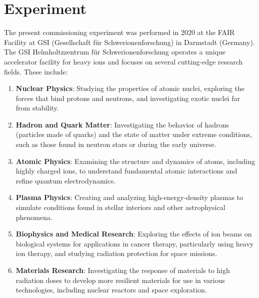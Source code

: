\section{Experiment}
The present commissioning experiment was performed in 2020 at the FAIR Facility at GSI (Gesellschaft f\"ur Schwerionenforschung) in Darmstadt (Germany). The GSI Helmholtzzentrum für Schwerionenforschung operates a unique accelerator facility for heavy ions and focuses on several cutting-edge research fields. These include:\newline
\begin{enumerate}
\item \textbf{Nuclear Physics}: Studying the properties of atomic nuclei, exploring the forces that bind protons and neutrons, and investigating exotic nuclei far from stability.
\item \textbf{Hadron and Quark Matter}: Investigating the behavior of hadrons (particles made of quarks) and the state of matter under extreme conditions, such as those found in neutron stars or during the early universe.
\item \textbf{Atomic Physics}: Examining the structure and dynamics of atoms, including highly charged ions, to understand fundamental atomic interactions and refine quantum electrodynamics.
\item \textbf{Plasma Physics}: Creating and analyzing high-energy-density plasmas to simulate conditions found in stellar interiors and other astrophysical phenomena.
\item \textbf{Biophysics and Medical Research}: Exploring the effects of ion beams on biological systems for applications in cancer therapy, particularly using heavy ion therapy, and studying radiation protection for space missions.
\item \textbf{Materials Research}: Investigating the response of materials to high radiation doses to develop more resilient materials for use in various technologies, including nuclear reactors and space exploration.
\end{enumerate}
